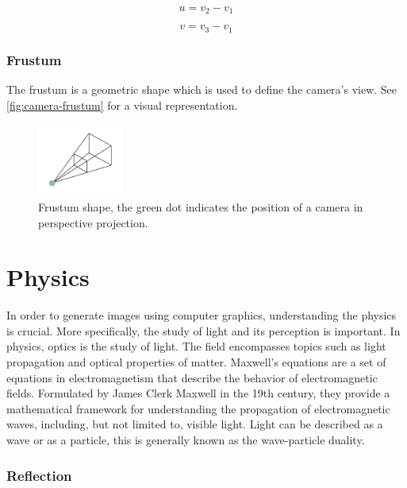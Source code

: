\begin{equation}
  \label{eqn:triangle-vertices-to-q-u-v1}
  u = v_2 - v_1
\end{equation}

\begin{equation}
  \label{eqn:triangle-vertices-to-q-u-v2}
  v = v_3 - v_1
\end{equation}

\subsubsection{Frustum}

The frustum is a geometric shape which is used to define the camera's view. See \autoref{fig:camera-frustum} for a visual representation.

\begin{figure}[H]
  \centering
  \includegraphics[width=0.25\textwidth]{resources/camera-frustum.png}
  \caption{Frustum shape, the green dot indicates the position of a camera in perspective projection.}
  \label{fig:camera-frustum}
\end{figure}

\section{Physics}

In order to generate images using computer graphics, understanding the physics is crucial. More specifically, the study of light and its perception is important. In physics, optics is the study of light. The field encompasses topics such as light propagation and optical properties of matter. Maxwell's equations are a set of equations in electromagnetism that describe the behavior of electromagnetic fields. Formulated by James Clerk Maxwell in the 19th century, they provide a mathematical framework for understanding the propagation of electromagnetic waves, including, but not limited to, visible light. Light can be described as a wave or as a particle, this is generally known as the wave-particle duality. \cite{fowles1989introduction}

\subsubsection{Reflection}

